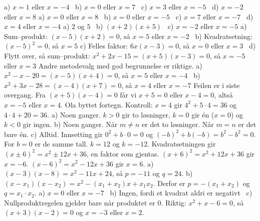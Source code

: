 
 a) $x = 1$ eller $x = -4$ \ b) $x = 0$ eller $x = 7$ \ c) $x = 3$ eller $x = -5$ \ d) $x = -2$ eller $x = 8$
 a) $x = 0$ eller $x = 8$ \ b) $x = 0$ eller $x = -5$ \ c) $x = 7$ eller $x = -7$ \ d) $x = 4$ eller $x = -4$
 a) $2$ og $5$ \ b) $(x+2)(x+5)$ \ c) $x = -2$ eller $x = -5$
 a) Sum--produkt: $(x-5)(x+2) = 0$, så $x = 5$ eller $x = -2$ \ b) Kvadratsetning: $(x-5)^2 = 0$, så $x = 5$
c) Felles faktor: $6x(x-3) = 0$, så $x = 0$ eller $x = 3$ \ d) Flytt over, så sum--produkt: $x^2 + 2x - 15 = (x+5)(x-3) = 0$, så $x = -5$ eller $x = 3$
Andre metodevalg med god begrunnelse er riktige.
 a) $x^2 - x - 20 = (x-5)(x+4) = 0$, så $x = 5$ eller $x = -4$ \
b) $x^2 + 3x - 28 = (x-4)(x+7) = 0$, så $x = 4$ eller $x = -7$
 Feilen er i siste overgang. Fra $(x+5)(x-4) = 0$ får vi $x + 5 = 0$ eller $x - 4 = 0$, altså $x = -5$ eller $x = 4$.
Ola byttet fortegn. Kontroll: $x = 4$ gir $4^2 + 5 \cdot 4 = 36$ og $4 \cdot 4 + 20 = 36$.
\fo{1.7} a) Noen ganger. $k > 0$ gir to løsninger, $k = 0$ gir én ($x = 0$) og $k < 0$ gir ingen.
b) Noen ganger. Når $m \neq n$ er det to løsninger. Når $m = n$ er det bare én.
c) Alltid. Innsetting gir $0^2 + b \cdot 0 = 0$ og $(-b)^2 + b(-b) = b^2 - b^2 = 0$. For $b = 0$ er de samme tall.
\fo{1.8} $k = 12$ og $k = -12$. Kvadratsetningen gir $(x \pm 6)^2 = x^2 \pm 12x + 36$, en faktor som gjentas. $(x+6)^2 = x^2 + 12x + 36$ gir $x = -6$. $(x-6)^2 = x^2 - 12x + 36$ gir $x = 6$.
\fo{1.9} a) $(x-3)(x-8) = x^2 - 11x + 24$, så $p = -11$ og $q = 24$.
b) $(x - x_1)(x - x_2) = x^2 - (x_1 + x_2)x + x_1 x_2$. Derfor er $p = -(x_1 + x_2)$ og $q = x_1 \cdot x_2$.
\fo{Sjekk 1} a) $x = 0$ eller $x = -7$ \ b) Ingen, fordi et kvadrat aldri er negativt \
c) Nullproduktregelen gjelder bare når produktet er 0. Riktig: $x^2 + x - 6 = 0$, så $(x+3)(x-2) = 0$ og $x = -3$ eller $x = 2$.

